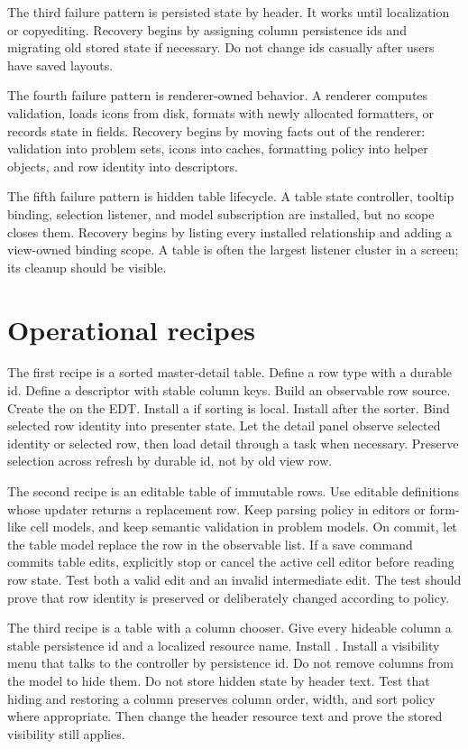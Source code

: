 The third failure pattern is persisted state by header. It works until
localization or copyediting. Recovery begins by assigning column persistence
ids and migrating old stored state if necessary. Do not change ids casually
after users have saved layouts.

The fourth failure pattern is renderer-owned behavior. A renderer computes
validation, loads icons from disk, formats with newly allocated formatters, or
records state in fields. Recovery begins by moving facts out of the renderer:
validation into problem sets, icons into caches, formatting policy into helper
objects, and row identity into descriptors.

The fifth failure pattern is hidden table lifecycle. A table state controller,
tooltip binding, selection listener, and model subscription are installed, but
no scope closes them. Recovery begins by listing every installed relationship
and adding a view-owned binding scope. A table is often the largest listener
cluster in a screen; its cleanup should be visible.

\section{Operational recipes}

The first recipe is a sorted master-detail table. Define a row type with a
durable id. Define a descriptor with stable column keys. Build an observable
row source. Create the  on the EDT. Install a
 if sorting is local. Install 
after the sorter. Bind selected row identity into presenter state. Let the
detail panel observe selected identity or selected row, then load detail
through a task when necessary. Preserve selection across refresh by durable id,
not by old view row.

The second recipe is an editable table of immutable rows. Use editable
 definitions whose updater returns a replacement row. Keep
parsing policy in editors or form-like cell models, and keep semantic
validation in problem models. On commit, let the table model replace the row
in the observable list. If a save command commits table edits, explicitly stop
or cancel the active cell editor before reading row state. Test both a valid
edit and an invalid intermediate edit. The test should prove that row identity
is preserved or deliberately changed according to policy.

The third recipe is a table with a column chooser. Give every hideable column
a stable persistence id and a localized resource name. Install
. Install a visibility menu that talks to the
controller by persistence id. Do not remove columns from the model to hide
them. Do not store hidden state by header text. Test that hiding and restoring
a column preserves column order, width, and sort policy where appropriate.
Then change the header resource text and prove the stored visibility still
applies.

